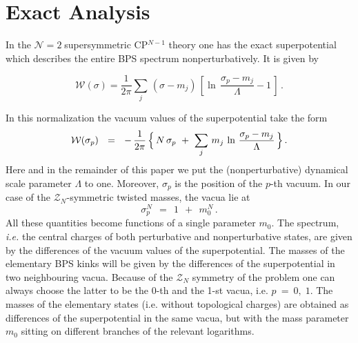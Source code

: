 \documentclass[epsfig,12pt]{article}
\def\beq{\begin{equation}}
\def\eeq{\end{equation}}
\newcommand{\ntwo}{${\mathcal N}=2\;$}
\def\beq{\begin{equation}}
\def\eeq{\end{equation}}
\newcommand{\mc}[1]{\mathcal{#1}}
\newcommand{\W}{\mathcal{W}}
\begin{document}
	



\section{Exact Analysis}
\setcounter{equation}{0}
\label{exact}

	In the \ntwo supersymmetric CP$^{N-1}$ theory one has the exact superpotential which
	  describes the entire BPS  spectrum nonperturbatively. It is given by \cite{W93,AdDVecSal,ChVa,HaHo}
	
\beq
\W (\sigma) = \frac{1}{2\pi}
 \sum_j\,(\sigma - m_j)\, \left[\ln \,\frac{\sigma_p - m_j}{\Lambda} -1\,\right]\,.
\eeq


In this  normalization the vacuum values of the superpotential take 
	the form
\beq
\label{Wvac}
	\W ( \sigma_p ) ~~=~~ 
		-\, \frac{1}{2\pi}\,  
                \Bigl\{\, N\, \sigma_p ~+~ \sum_j\, m_j\, \ln \,\frac{\sigma_p - m_j}{\Lambda} \,\Bigr\}\,.
\eeq
	Here and in the remainder of this   paper we put the (nonperturbative) dynamical scale parameter $ \Lambda $ to one.
	Moreover, $ \sigma_p $ is   the position of the $p$-th vacuum.
	In our case of the $ \mc{Z}_N $-symmetric twisted masses, the vacua lie at
\beq
\label{sig}
	\sigma_p^N  ~~=~~ 1 ~~+~~ m_0^N \,.
\eeq
	All these quantities become functions of a single parameter $ m_0 $.
	The spectrum, {\it i.e.} the central charges of both perturbative and nonperturbative states,
	are given by the differences of the vacuum values of the superpotential.
	The masses of the elementary BPS kinks will be given by the differences of the superpotential in
	two neighbouring vacua.
	Because of the $ \mc{Z}_N $ symmetry of the problem one can always choose the latter to be 
	the 0-th and the 1-st vacua,  i.e. $ p ~=~ 0,\; 1 $.
	The masses of the elementary states (i.e. without topological charges) are obtained as differences of the superpotential in the
	same vacua, but with the mass parameter $ m_0 $ sitting on different branches of 
	the relevant logarithms.
\end{document}
